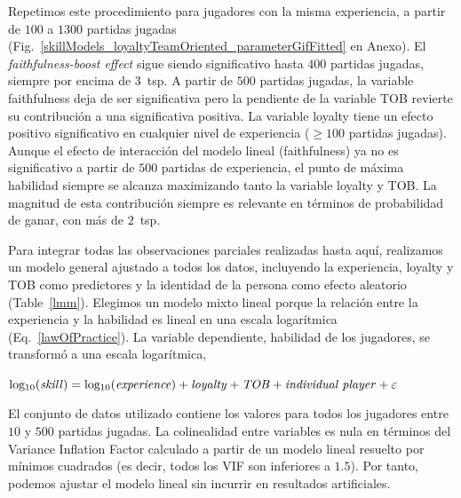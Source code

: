 \documentclass[a4paper,11pt]{book}
\theoremstyle{definition}
\begin{document}
Repetimos este procedimiento para jugadores con la misma experiencia, a partir de $100$ a $1300$ partidas jugadas (Fig.~\ref{skillModels_loyaltyTeamOriented_parameterGifFitted} en Anexo).
%
El \emph{faithfulness-boost effect} sigue siendo significativo hasta $400$ partidas jugadas, siempre por encima de $3$~tsp.
%
A partir de $500$ partidas jugadas, la variable faithfulness deja de ser significativa pero la pendiente de la variable TOB revierte su contribuci\'on a una significativa positiva.
%
La variable loyalty tiene un efecto positivo significativo en cualquier nivel de experiencia ($\geq 100$ partidas jugadas).
%
Aunque el efecto de interacci\'on del modelo lineal (faithfulness) ya no es significativo a partir de $500$ partidas de experiencia, el punto de m\'axima habilidad siempre se alcanza maximizando tanto la variable loyalty y TOB.
%
La magnitud de esta contribuci\'on siempre es relevante en t\'erminos de probabilidad de ganar, con m\'as de $2$~tsp.


Para integrar todas las observaciones parciales realizadas hasta aqu\'i, realizamos un modelo general ajustado a todos los datos, incluyendo la experiencia, loyalty y TOB como predictores y la identidad de la persona como efecto aleatorio (Table~\ref{lmm}).
%
Elegimos un modelo mixto lineal porque la relaci\'on entre la experiencia y la habilidad es lineal en una escala logar\'itmica (Eq.~\ref{lawOfPractice}).
%
La variable dependiente, habilidad de los jugadores, se transform\'o a una escala logar\'itmica,

\begin{center}
$\text{log$_{10}$(\emph{skill})} = \text{log$_{10}$(\emph{experience})} + \text{\emph{loyalty}} + \text{\emph{TOB}} + \text{\emph{individual player}} + \varepsilon$
\end{center}

El conjunto de datos utilizado contiene los valores para todos los jugadores entre $10$ y $500$ partidas jugadas.
%
La colinealidad entre variables es nula en t\'erminos del Variance Inflation Factor calculado a partir de un modelo lineal resuelto por m\'inimos cuadrados (es decir, todos los VIF son inferiores a $1.5$).
%
Por tanto, podemos ajustar el modelo lineal sin incurrir en resultados artificiales.
\end{document}
